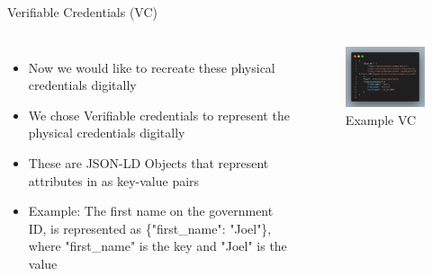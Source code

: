 \documentclass[
	english,%
	authorontitle=true,
	]{bfhbeamer}
\begin{document}
\begin{frame}{Verifiable Credentials (VC)}
    \begin{columns}[onlytextwidth,T]
        \column{70mm}  

    \begin{itemize}
        \item Now we would like to recreate these physical credentials digitally
        \item We chose Verifiable credentials to represent the physical credentials digitally
        \item These are JSON-LD Objects that represent attributes in as key-value pairs
        \item Example: The first name on the government ID, is represented as \{"first\_name": "Joel"\}, where "first\_name" is the key and "Joel" is the value
    \end{itemize}

    \column{70mm}
    \begin{figure}
        \centering
        \includegraphics[width=70mm]{./img/VCexp.png}
        \caption{Example VC}
    \end{figure}

    \end{columns}
\end{frame}
\end{document}
